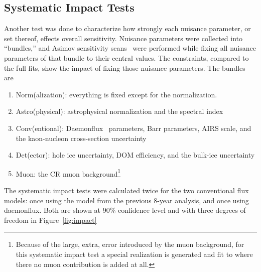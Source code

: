 \documentclass[main.tex]{subfiles}
\begin{document}
\subsection{Systematic Impact Tests}

Another test was done to characterize how strongly each nuisance parameter, or set thereof, effects overall sensitivity. 
Nuisance parameters were collected into ``bundles,'' and Asimov sensitivity scans~\cite{Cowan_2011} were performed while fixing all nuisance parameters of that bundle to their central values.
The constraints, compared to the full fits, show the impact of fixing those nuisance parameters. 
The bundles are 
\begin{enumerate}
    \item Norm(alization): everything is fixed except for the normalization.
    \item Astro(physical): astrophysical normalization and the spectral index
    \item Conv(entional): Daemonflux~\cite{yanez2023daemonflux} parameters, Barr parameters, AIRS scale, and the kaon-nucleon cross-section uncertainty
    \item Det(ector): hole ice uncertainty, DOM efficiency, and the bulk-ice uncertainty
    \item Muon: the CR muon background\footnote{Because of the large, extra, error introduced by the muon background, for this systematic impact test a special realization is generated and fit to where there no muon contribution is added at all.}
\end{enumerate}
The systematic impact tests were calculated twice for the two conventional flux models: once using the model from the previous 8-year analysis, and once using daemonflux. 
Both are shown at 90\% confidence level and with three degrees of freedom in Figure~\ref{fig:impact}
\end{document}
